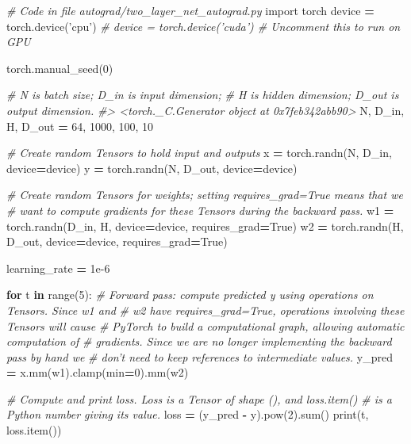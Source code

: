 \documentclass[]{book}
\newenvironment{Shaded}{\begin{snugshade}}{\end{snugshade}}
\newcommand{\BuiltInTok}[1]{#1}
\newcommand{\CommentTok}[1]{\textcolor[rgb]{0.56,0.35,0.01}{\textit{#1}}}
\newcommand{\ControlFlowTok}[1]{\textcolor[rgb]{0.13,0.29,0.53}{\textbf{#1}}}
\newcommand{\DecValTok}[1]{\textcolor[rgb]{0.00,0.00,0.81}{#1}}
\newcommand{\FloatTok}[1]{\textcolor[rgb]{0.00,0.00,0.81}{#1}}
\newcommand{\ImportTok}[1]{#1}
\newcommand{\KeywordTok}[1]{\textcolor[rgb]{0.13,0.29,0.53}{\textbf{#1}}}
\newcommand{\NormalTok}[1]{#1}
\newcommand{\OperatorTok}[1]{\textcolor[rgb]{0.81,0.36,0.00}{\textbf{#1}}}
\newcommand{\StringTok}[1]{\textcolor[rgb]{0.31,0.60,0.02}{#1}}
\newcommand{\VariableTok}[1]{\textcolor[rgb]{0.00,0.00,0.00}{#1}}
\begin{document}
\begin{Shaded}
\begin{Highlighting}[]
\CommentTok{# Code in file autograd/two_layer_net_autograd.py}
\ImportTok{import}\NormalTok{ torch}
\NormalTok{device }\OperatorTok{=}\NormalTok{ torch.device(}\StringTok{'cpu'}\NormalTok{)}
\CommentTok{# device = torch.device('cuda') # Uncomment this to run on GPU}

\NormalTok{torch.manual_seed(}\DecValTok{0}\NormalTok{)}

\CommentTok{# N is batch size; D_in is input dimension;}
\CommentTok{# H is hidden dimension; D_out is output dimension.}
\CommentTok{#> <torch._C.Generator object at 0x7feb342abb90>}
\NormalTok{N, D_in, H, D_out }\OperatorTok{=} \DecValTok{64}\NormalTok{, }\DecValTok{1000}\NormalTok{, }\DecValTok{100}\NormalTok{, }\DecValTok{10}

\CommentTok{# Create random Tensors to hold input and outputs}
\NormalTok{x }\OperatorTok{=}\NormalTok{ torch.randn(N, D_in, device}\OperatorTok{=}\NormalTok{device)}
\NormalTok{y }\OperatorTok{=}\NormalTok{ torch.randn(N, D_out, device}\OperatorTok{=}\NormalTok{device)}

\CommentTok{# Create random Tensors for weights; setting requires_grad=True means that we}
\CommentTok{# want to compute gradients for these Tensors during the backward pass.}
\NormalTok{w1 }\OperatorTok{=}\NormalTok{ torch.randn(D_in, H, device}\OperatorTok{=}\NormalTok{device, requires_grad}\OperatorTok{=}\VariableTok{True}\NormalTok{)}
\NormalTok{w2 }\OperatorTok{=}\NormalTok{ torch.randn(H, D_out, device}\OperatorTok{=}\NormalTok{device, requires_grad}\OperatorTok{=}\VariableTok{True}\NormalTok{)}

\NormalTok{learning_rate }\OperatorTok{=} \FloatTok{1e-6}

\ControlFlowTok{for}\NormalTok{ t }\KeywordTok{in} \BuiltInTok{range}\NormalTok{(}\DecValTok{5}\NormalTok{):}
  \CommentTok{# Forward pass: compute predicted y using operations on Tensors. Since w1 and}
  \CommentTok{# w2 have requires_grad=True, operations involving these Tensors will cause}
  \CommentTok{# PyTorch to build a computational graph, allowing automatic computation of}
  \CommentTok{# gradients. Since we are no longer implementing the backward pass by hand we}
  \CommentTok{# don't need to keep references to intermediate values.}
\NormalTok{  y_pred }\OperatorTok{=}\NormalTok{ x.mm(w1).clamp(}\BuiltInTok{min}\OperatorTok{=}\DecValTok{0}\NormalTok{).mm(w2)}
  
  \CommentTok{# Compute and print loss. Loss is a Tensor of shape (), and loss.item()}
  \CommentTok{# is a Python number giving its value.}
\NormalTok{  loss }\OperatorTok{=}\NormalTok{ (y_pred }\OperatorTok{-}\NormalTok{ y).}\BuiltInTok{pow}\NormalTok{(}\DecValTok{2}\NormalTok{).}\BuiltInTok{sum}\NormalTok{()}
  \BuiltInTok{print}\NormalTok{(t, loss.item())}


\end{Highlighting}
\end{Shaded}
\end{document}
